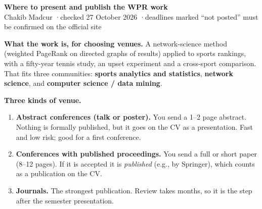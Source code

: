 \documentclass[10pt]{article}
\begin{document}
{\Large\bfseries Where to present and publish the WPR work}\\[0.3em]
Chakib Madcur \quad·\quad checked 27 October 2026 \quad·\quad deadlines marked ``not posted'' must be confirmed on the official site

\textbf{What the work is, for choosing venues.} A network-science method (weighted PageRank on directed graphs of results) applied to sports rankings, with a fifty-year tennis study, an upset experiment and a cross-sport comparison. That fits three communities: \textbf{sports analytics and statistics}, \textbf{network science}, and \textbf{computer science / data mining}.

\textbf{Three kinds of venue.}
\begin{enumerate}[leftmargin=1.4em,itemsep=1pt,topsep=0pt]
\item \textbf{Abstract conferences (talk or poster).} You send a 1--2 page abstract. Nothing is formally published, but it goes on the CV as a presentation. Fast and low risk; good for a first conference.
\item \textbf{Conferences with published proceedings.} You send a full or short paper (8--12 pages). If it is accepted it is \emph{published} (e.g., by Springer), which counts as a publication on the CV.
\item \textbf{Journals.} The strongest publication. Review takes months, so it is the step after the semester presentation.
\end{enumerate}
\end{document}
